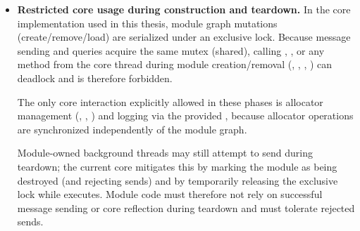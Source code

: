 \begin{itemize}
    \item \textbf{Restricted core usage during construction and teardown.}
    In the core implementation used in this thesis, module graph mutations (create/remove/load) are serialized under an exclusive  lock.
    Because message sending and  queries acquire the same mutex (shared), calling
    , ,  or any  method
    from the core thread during module creation/removal (, , , )
    can deadlock and is therefore forbidden.

    The only core interaction explicitly allowed in these phases is allocator management
    (, , ) and logging via the provided ,
    because allocator operations are synchronized independently of the module graph.

    Module-owned background threads may still attempt to send during teardown; the current core mitigates this by marking the module as being destroyed
    (and rejecting sends) and by temporarily releasing the exclusive lock while  executes.
    Module code must therefore not rely on successful message sending or core reflection during teardown and must tolerate rejected sends.



\end{itemize}
